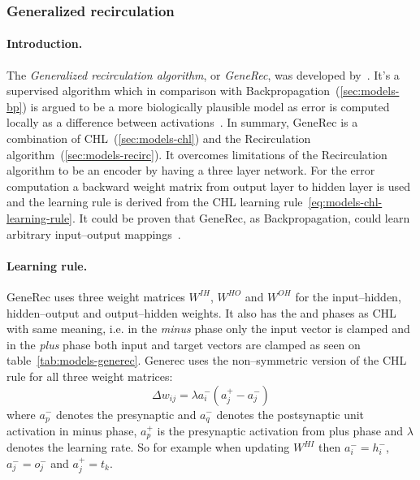 \subsubsection{Generalized recirculation}
\label{sec:models-generec} 

\paragraph{Introduction.} 
The \emph{Generalized recirculation algorithm}, or \emph{GeneRec}, was developed by~\citet{o1996bio}. It's a supervised algorithm which in comparison with Backpropagation~(\ref{sec:models-bp}) is argued to be a more biologically plausible model as error is computed locally as a difference between activations~\citep{o1998six, o2001generalization, da2011advances, schneider2009application}. In summary, GeneRec is a combination of CHL~(\ref{sec:models-chl}) and the Recirculation algorithm~(\ref{sec:models-recirc}). It overcomes limitations of the Recirculation algorithm to be an encoder by having a three layer network. For the error computation a backward weight matrix from output layer to hidden layer is used and the learning rule is derived from the CHL learning rule~\ref{eq:models-chl-learning-rule}. It could be proven that GeneRec, as Backpropagation, could learn arbitrary input--output mappings~\citep{o1996bio}. 

\paragraph{Learning rule.} 
\label{sec:models-generec-learning-rule} 
GeneRec uses three weight matrices $W^{IH}$, $W^{HO}$ and $W^{OH}$ for the input--hidden, hidden--output and output--hidden weights. It also has the \quotes{-} and \quotes{+} phases as CHL with same meaning, i.e. in the \emph{minus} phase only the input vector is clamped and in the \emph{plus} phase both input and target vectors are clamped as seen on table~\ref{tab:models-generec}. Generec uses the non--symmetric version of the CHL rule for all three weight matrices: 
\begin{equation}
  \label{eq:models-generec-learning-rule}
  \Delta w_{ij} = \lambda a^{-}_i(a^{+}_j - a^{-}_j)
\end{equation}
where $a^{-}_p$ denotes the presynaptic and $a^{-}_q$ denotes the postsynaptic unit activation in minus phase, $a^{+}_p$ is the presynaptic activation from plus phase and $\lambda$ denotes the learning rate. So for example when updating $W^{HI}$ then $a^{-}_i = h^{-}_i$, $a^{-}_j = o^{-}_j$ and $a^{+}_j = t_k$. 

